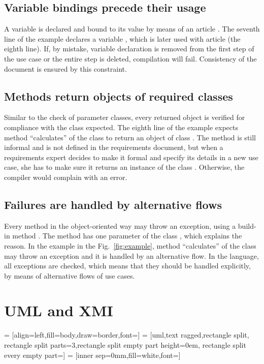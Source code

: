 \documentclass[sigplan,10pt,nonacm=true]{acmart}
\begin{document}
\subsection{Variable bindings precede their usage}

A variable is declared and bound to its value by means of an article
. The seventh line of the example declares a variable
, which is later used with article  (the eighth
line). If, by mistake, variable declaration is removed from the first step
of the use case or the entire step is deleted, compilation will fail.
Consistency of the document is ensured by this constraint.

\subsection{Methods return objects of required classes}

Similar to the check of parameter classes, every returned object is verified
for compliance with the class expected. The eighth line of the example
expects method ``calculates'' of the class  to return an object
of class . The method is still informal and is not defined in
the requirements document, but when a requirements expert decides to make it
formal and specify its details in a new use case, she has to make sure it
returns an instance of the class . Otherwise, the compiler would
complain with an error.

\subsection{Failures are handled by alternative flows}

Every method in the object-oriented way may throw an exception, using a
build-in method . The method has one parameter of the class
, which explains the reason. In the example in
the Fig.~\ref{fig:example}, method ``calculates'' of the class  may
throw an exception and it is handled by an alternative flow. In the language, all
exceptions are checked, which means that they should be handled explicitly,
by means of alternative flows of use cases.

\section{UML and XMI}
\label{sec:uml}
 = [align=left,fill=body,draw=border,font={\small\ttfamily}]
 = [uml,text ragged,rectangle split,
rectangle split parts=3,rectangle split empty part height=0em,
rectangle split every empty part={}]
 = [inner sep=0mm,fill=white,font={\scriptsize\ttfamily}]
\end{document}
